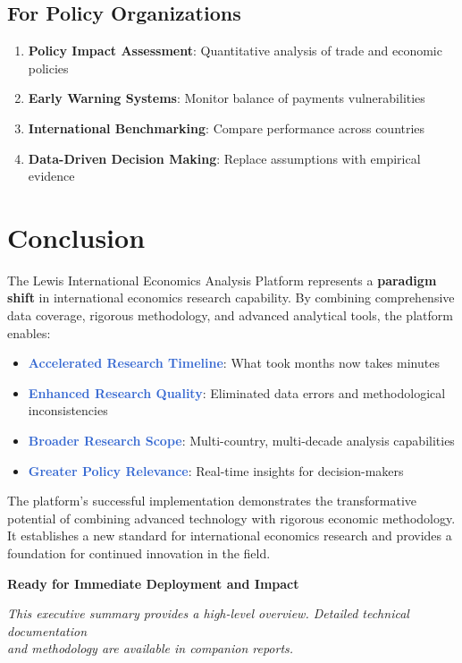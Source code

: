 \documentclass[11pt,a4paper]{article}
\begin{document}
\subsection{For Policy Organizations}
\begin{enumerate}
    \item \textbf{Policy Impact Assessment}: Quantitative analysis of trade and economic policies
    \item \textbf{Early Warning Systems}: Monitor balance of payments vulnerabilities
    \item \textbf{International Benchmarking}: Compare performance across countries
    \item \textbf{Data-Driven Decision Making}: Replace assumptions with empirical evidence
\end{enumerate}

\section{Conclusion}

The Lewis International Economics Analysis Platform represents a \textbf{paradigm shift} in international economics research capability. By combining comprehensive data coverage, rigorous methodology, and advanced analytical tools, the platform enables:

\begin{itemize}
    \item \textcolor{highlight}{\textbf{Accelerated Research Timeline}}: What took months now takes minutes
    \item \textcolor{highlight}{\textbf{Enhanced Research Quality}}: Eliminated data errors and methodological inconsistencies
    \item \textcolor{highlight}{\textbf{Broader Research Scope}}: Multi-country, multi-decade analysis capabilities
    \item \textcolor{highlight}{\textbf{Greater Policy Relevance}}: Real-time insights for decision-makers
\end{itemize}

The platform's successful implementation demonstrates the transformative potential of combining advanced technology with rigorous economic methodology. It establishes a new standard for international economics research and provides a foundation for continued innovation in the field.

\begin{center}
\textbf{\large Ready for Immediate Deployment and Impact}
\end{center}

\vspace{0.5cm}

\begin{center}
\textit{This executive summary provides a high-level overview. Detailed technical documentation\\and methodology are available in companion reports.}
\end{center}
\end{document}
